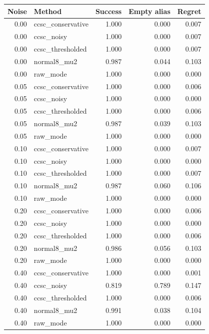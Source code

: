 \begin{tabular}{rlrrr}
\toprule
Noise & Method & Success & Empty alias & Regret \\
\midrule
0.00 & ccsc\_conservative & 1.000 & 0.000 & 0.007 \\
0.00 & ccsc\_noisy & 1.000 & 0.000 & 0.007 \\
0.00 & ccsc\_thresholded & 1.000 & 0.000 & 0.007 \\
0.00 & normal8\_mu2 & 0.987 & 0.044 & 0.103 \\
0.00 & raw\_mode & 1.000 & 0.000 & 0.000 \\
0.05 & ccsc\_conservative & 1.000 & 0.000 & 0.006 \\
0.05 & ccsc\_noisy & 1.000 & 0.000 & 0.000 \\
0.05 & ccsc\_thresholded & 1.000 & 0.000 & 0.006 \\
0.05 & normal8\_mu2 & 0.987 & 0.039 & 0.103 \\
0.05 & raw\_mode & 1.000 & 0.000 & 0.000 \\
0.10 & ccsc\_conservative & 1.000 & 0.000 & 0.007 \\
0.10 & ccsc\_noisy & 1.000 & 0.000 & 0.000 \\
0.10 & ccsc\_thresholded & 1.000 & 0.000 & 0.007 \\
0.10 & normal8\_mu2 & 0.987 & 0.060 & 0.106 \\
0.10 & raw\_mode & 1.000 & 0.000 & 0.000 \\
0.20 & ccsc\_conservative & 1.000 & 0.000 & 0.006 \\
0.20 & ccsc\_noisy & 1.000 & 0.000 & 0.000 \\
0.20 & ccsc\_thresholded & 1.000 & 0.000 & 0.006 \\
0.20 & normal8\_mu2 & 0.986 & 0.056 & 0.103 \\
0.20 & raw\_mode & 1.000 & 0.000 & 0.000 \\
0.40 & ccsc\_conservative & 1.000 & 0.000 & 0.001 \\
0.40 & ccsc\_noisy & 0.819 & 0.789 & 0.147 \\
0.40 & ccsc\_thresholded & 1.000 & 0.000 & 0.006 \\
0.40 & normal8\_mu2 & 0.991 & 0.038 & 0.104 \\
0.40 & raw\_mode & 1.000 & 0.000 & 0.000 \\
\bottomrule
\end{tabular}
